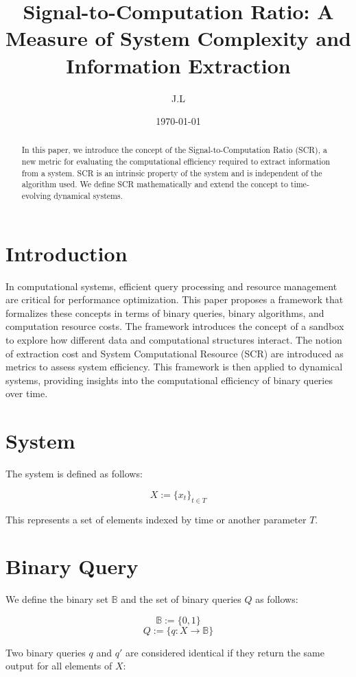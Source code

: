 \documentclass[11pt,a4paper]{article}
\title{Signal-to-Computation Ratio: A Measure of System Complexity and Information Extraction}
\author{J.L}
\date{\today}
\theoremstyle{definition}
\theoremstyle{remark}
\numberwithin{equation}{section}
\begin{document}
\maketitle

\begin{abstract}
In this paper, we introduce the concept of the Signal-to-Computation Ratio (SCR), a new metric for evaluating the computational efficiency required to extract information from a system. SCR is an intrinsic property of the system and is independent of the algorithm used. We define SCR mathematically and extend the concept to time-evolving dynamical systems.
\end{abstract}

\section{Introduction}
In computational systems, efficient query processing and resource management are critical for performance optimization. This paper proposes a framework that formalizes these concepts in terms of binary queries, binary algorithms, and computation resource costs. The framework introduces the concept of a sandbox to explore how different data and computational structures interact. The notion of extraction cost and System Computational Resource (SCR) are introduced as metrics to assess system efficiency. This framework is then applied to dynamical systems, providing insights into the computational efficiency of binary queries over time.

\section{System}

The system is defined as follows:

\[
X := \{ x_t \}_{t \in T}
\]

This represents a set of elements indexed by time or another parameter $T$.

\section{Binary Query}

We define the binary set $\mathbb{B}$ and the set of binary queries $Q$ as follows:

\[
\mathbb{B} := \{ 0, 1 \}
\]
\[
Q := \{ q : X \rightarrow \mathbb{B} \}
\]

Two binary queries $q$ and $q'$ are considered identical if they return the same output for all elements of $X$:
\end{document}
